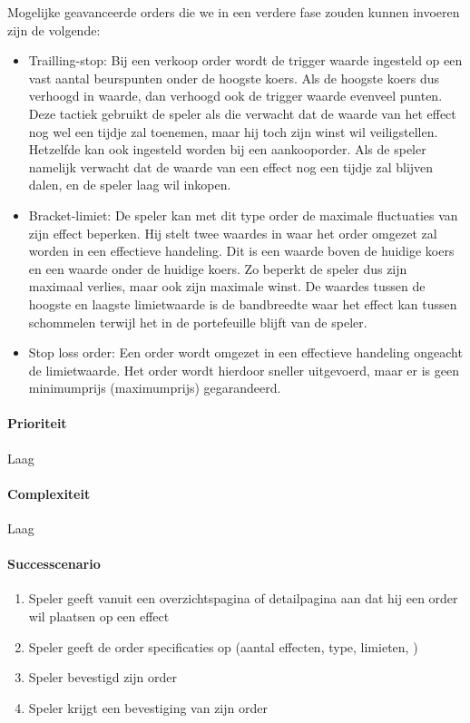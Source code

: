 Mogelijke geavanceerde orders die we in een verdere fase zouden kunnen invoeren zijn de volgende:
\begin{itemize}
	\item Trailling-stop: Bij een verkoop order wordt de trigger waarde ingesteld op een vast aantal beurspunten onder de hoogste koers. Als de hoogste koers dus verhoogd in waarde, dan verhoogd ook de trigger waarde evenveel punten. Deze tactiek gebruikt de speler als die verwacht dat de waarde van het effect nog wel een tijdje zal toenemen, maar hij toch zijn winst wil veiligstellen. Hetzelfde kan ook ingesteld worden bij een aankooporder. Als de speler namelijk verwacht dat de waarde van een effect nog een tijdje zal blijven dalen, en de speler laag wil inkopen.
  \item Bracket-limiet: De speler kan met dit type order de maximale fluctuaties van zijn effect beperken. Hij stelt twee waardes in waar het order omgezet zal worden in een effectieve handeling. Dit is een waarde boven de huidige koers en een waarde onder de huidige koers. Zo beperkt de speler dus zijn maximaal verlies, maar ook zijn maximale winst. De waardes tussen de hoogste en laagste limietwaarde is de bandbreedte waar het effect kan tussen schommelen terwijl het in de portefeuille blijft van de speler.
  \item Stop loss order: Een order wordt omgezet in een effectieve handeling ongeacht de limietwaarde. Het order wordt hierdoor sneller uitgevoerd, maar er is geen minimumprijs (maximumprijs) gegarandeerd.
\end{itemize}
\paragraph{Prioriteit}Laag
\paragraph{Complexiteit}Laag
\paragraph{Successcenario}
\begin{enumerate}
 \item Speler geeft vanuit een overzichtspagina of detailpagina aan dat hij een order wil plaatsen op een effect
 \item Speler geeft de order specificaties op (aantal effecten, type, limieten, )
 \item Speler bevestigd zijn order
 \item \label{def:aankopen:bevestiging} Speler krijgt een bevestiging van zijn order
\end{enumerate}
